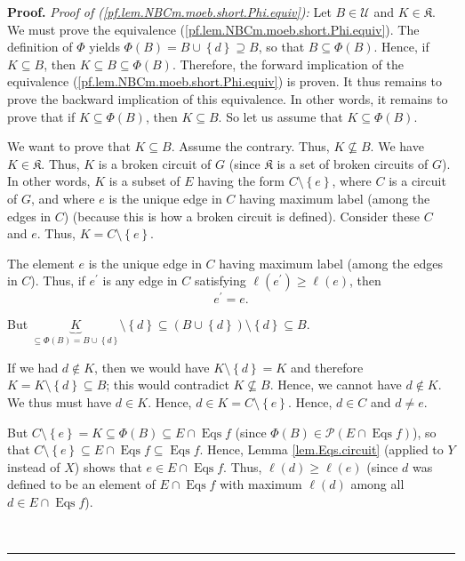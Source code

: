 \documentclass[numbers=enddot,12pt,final,onecolumn,notitlepage]{scrartcl}%
\theoremstyle{definition}
\newenvironment{proof}[1][Proof]{\noindent\textbf{#1.} }{\ \rule{0.5em}{0.5em}}
\newenvironment{vershort}{}{}
\begin{document}
\begin{vershort}
\begin{proof}
\textit{Proof of (\ref{pf.lem.NBCm.moeb.short.Phi.equiv}):} Let $B\in
\mathcal{U}$ and $K\in\mathfrak{K}$. We must prove the equivalence
(\ref{pf.lem.NBCm.moeb.short.Phi.equiv}). The definition of $\Phi$ yields
$\Phi\left(  B\right)  =B\cup\left\{  d\right\}  \supseteq B$, so that
$B\subseteq\Phi\left(  B\right)  $. Hence, if $K\subseteq B$, then $K\subseteq
B\subseteq\Phi\left(  B\right)  $. Therefore, the forward implication of the
equivalence (\ref{pf.lem.NBCm.moeb.short.Phi.equiv}) is proven. It thus
remains to prove the backward implication of this equivalence. In other words,
it remains to prove that if $K\subseteq\Phi\left(  B\right)  $, then
$K\subseteq B$. So let us assume that $K\subseteq\Phi\left(  B\right)  $.

We want to prove that $K\subseteq B$. Assume the contrary. Thus,
$K\not \subseteq B$. We have $K\in\mathfrak{K}$. Thus, $K$ is a broken circuit
of $G$ (since $\mathfrak{K}$ is a set of broken circuits of $G$). In other
words, $K$ is a subset of $E$ having the form $C\setminus\left\{  e\right\}
$, where $C$ is a circuit of $G$, and where $e$ is the unique edge in $C$
having maximum label (among the edges in $C$) (because this is how a broken
circuit is defined). Consider these $C$ and $e$. Thus, $K=C\setminus\left\{
e\right\}  $.

The element $e$ is the unique edge in $C$ having maximum label (among
the edges in $C$). Thus, if $e^{\prime}$ is any edge in $C$ satisfying
$\ell\left(  e^{\prime}\right)  \geq\ell\left(  e\right)  $, then%
\begin{equation}
e^{\prime}=e. \label{pf.lem.NBCm.moeb.short.Phi.equiv.pf.e'}%
\end{equation}


But $\underbrace{K}_{\subseteq\Phi\left(  B\right)  =B\cup\left\{  d\right\}
}\setminus\left\{  d\right\}  \subseteq\left(  B\cup\left\{  d\right\}
\right)  \setminus\left\{  d\right\}  \subseteq B$.

If we had $d\notin K$, then we would have $K\setminus\left\{  d\right\}  =K$
and therefore $K=K\setminus\left\{  d\right\}  \subseteq B$; this would
contradict $K\not \subseteq B$. Hence, we cannot have $d\notin K$. We thus
must have $d\in K$. Hence, $d\in K=C\setminus\left\{  e\right\}  $. Hence,
$d\in C$ and $d\neq e$.

But $C\setminus\left\{  e\right\}  =K\subseteq\Phi\left(  B\right)  \subseteq
E\cap\operatorname*{Eqs}f$ (since $\Phi\left(  B\right)  \in\mathcal{P}\left(
E\cap\operatorname*{Eqs}f\right)  $), so that $C\setminus\left\{  e\right\}
\subseteq E\cap\operatorname*{Eqs}f\subseteq\operatorname*{Eqs}f$. Hence,
Lemma \ref{lem.Eqs.circuit} (applied to $Y$ instead of $X$) shows that $e\in
E\cap\operatorname*{Eqs}f$. Thus, $\ell\left(  d\right)  \geq\ell\left(
e\right)  $ (since $d$ was defined to be an element of $E\cap
\operatorname*{Eqs}f$ with maximum $\ell\left(  d\right)  $ among all $d\in
E\cap\operatorname*{Eqs}f$).


\end{proof}
\end{vershort}
\end{document}
